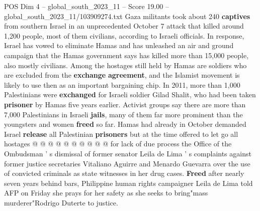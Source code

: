 \begin{textsample}{POS Dim 4 – global\_south\_2023\_11 – Score 19.00 – global\_south\_2023\_11/103909274.txt}
Gaza militants took about 240 \textbf{captives} from southern Israel in an unprecedented October 7 attack that killed around 1,200 people, most of them civilians, according to Israeli officials.
In response, Israel has vowed to eliminate Hamas and has unleashed an air and ground campaign that the Hamas government says has killed more than 15,000 people, also mostly civilians.
Among the hostages still held by Hamas are soldiers who are excluded from the \textbf{exchange} \textbf{agreement}, and the Islamist movement is likely to use then as an important bargaining chip.
In 2011, more than 1,000 Palestinians were \textbf{exchanged} for Israeli soldier Gilad Shalit, who had been taken \textbf{prisoner} by Hamas five years earlier.
Activist groups say there are more than 7,000 Palestinians in Israeli \textbf{jails}, many of them far more prominent than the youngsters and women \textbf{freed} so far.
Hamas had already in October demanded Israel \textbf{release} all Palestinian \textbf{prisoners} but at the time offered to let go all hostages @ @ @ @ @ @ @ @ @ @ for lack of due process the Office of the Ombudsman ' s dismissal of former senator Leila de Lima ' s complaints against former justice secretaries Vitaliano Aguirre and Menardo Guevarra over the use of convicted criminals as state witnesses in her drug cases. \textbf{Freed} after nearly seven years behind bars, Philippine human rights campaigner Leila de Lima told AFP on Friday she prays for her safety as she seeks to bring"mass murderer"Rodrigo Duterte to justice.

\end{textsample}
